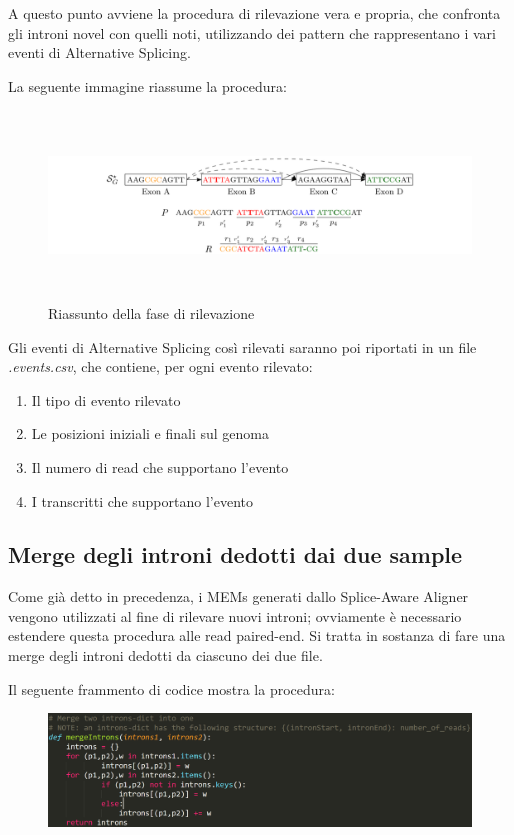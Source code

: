 A questo punto avviene la procedura di rilevazione vera e propria, che confronta gli introni novel con quelli noti, utilizzando dei pattern che rappresentano i vari eventi di Alternative Splicing.

La seguente immagine riassume la procedura:

\begin{figure}[h!]
	\centering
	\includegraphics[width=\linewidth, height=5cm]{images/riassuntorilevazione.png}
  \caption{Riassunto della fase di rilevazione}
  \label{fig:Summary}
\end{figure}

\newpage

Gli eventi di Alternative Splicing così rilevati saranno poi riportati in un file \textit{.events.csv}, che contiene, per ogni evento rilevato:
\begin{enumerate}
	\item Il tipo di evento rilevato
	\item Le posizioni iniziali e finali sul genoma
	\item Il numero di read che supportano l'evento
	\item I transcritti che supportano l'evento
\end{enumerate}

\subsection{Merge degli introni dedotti dai due sample}

Come già detto in precedenza, i MEMs generati dallo Splice-Aware Aligner vengono utilizzati al fine di rilevare nuovi introni; ovviamente è necessario estendere questa procedura alle read paired-end. Si tratta in sostanza di fare una merge degli introni dedotti da ciascuno dei due file.

Il seguente frammento di codice mostra la procedura:

\begin{figure}[h!]
	\centering
	\includegraphics[width=\linewidth]{images/mergeIntrons.png}
  \label{fig:MergeIntrons}
\end{figure}


